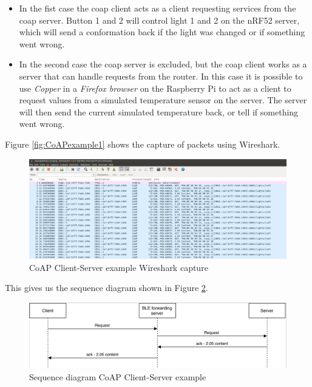 \begin{itemize}
  \item In the fist case the \gls{coap} client acts as a client requesting services from the \gls{coap} server. Button 1 and 2 will control light 1 and 2 on the nRF52 server, which will send a conformation back if the light was changed or if something went wrong.
  \item In the second case the \gls{coap} server is excluded, but the \gls{coap} client works as a server that can handle requests from the router. In this case it is possible to use \textit{Copper} in a \textit{Firefox browser} on the Raspberry Pi to act as a client to request values from a simulated temperature sensor on the server. The server will  then send the current simulated temperature back, or tell if something went wrong. 
\end{itemize} 

Figure \ref{fig:CoAPexample1} shows the capture of packets using Wireshark. 

\begin{figure}[ht]
    \centering
    \includegraphics[scale=0.27]{CoapEx1captureCropped2.png}    
    \caption{CoAP Client-Server example Wireshark capture}
    \label{fig:CoAPexample2}
\end{figure}


This gives us the sequence diagram shown in Figure \ref{fig:seq1}. 

\begin{figure}[ht]
    \centering
    \includegraphics[scale=0.27]{seq1.png}    
    \caption{Sequence diagram CoAP Client-Server example}
    \label{fig:seq1}
\end{figure}

